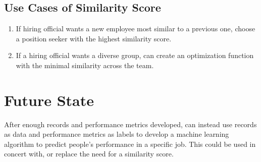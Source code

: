 \documentclass{article}
\begin{document}
\subsection{Use Cases of Similarity Score}

\begin{enumerate}
\item If hiring official wants a new employee most similar to a previous one, choose a position seeker with the highest similarity score.
\item If a hiring official wants a diverse group, can create an optimization function with the minimal similarity across the team.
\end{enumerate}


\section{Future State}

After enough records and performance metrics developed, can instead use records as data and performance metrics as labels to develop a machine learning algorithm to predict people's performance in a specific job. This could be used in concert with, or replace the need for a similarity score.
\end{document}
